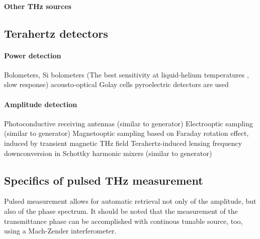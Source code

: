 \paragraph{Other THz sources}


\subsection{Terahertz detectors}
\paragraph{Power detection}
Bolometers, Si bolometers (The best sensitivity at liquid-helium temperatures ,  slow response)
acousto-optical Golay cells
pyroelectric detectors are used

\paragraph{Amplitude detection}
Photoconductive receiving antennas (similar to generator)
Electrooptic sampling (similar to generator)
Magnetooptic sampling based on Faraday rotation effect, induced by transient magnetic THz field
Terahertz-induced lensing 
frequency downconversion in Schottky harmonic mixers (similar to generator)





\subsection{Specifics of pulsed THz measurement}
Pulsed measurement allows for automatic retrieval not only of the amplitude, but also of the phase spectrum. It should be noted that the measurement of the transmittance phase can be accomplished with continous tunable source, too, using a Mach-Zender interferometer.

